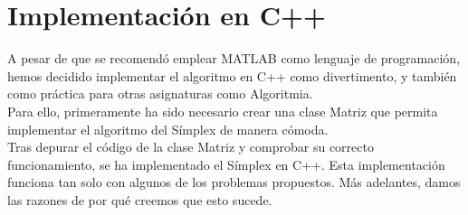 \documentclass[12pt, titlepage]{article}
\begin{document}
\section{Implementación en C++}
A pesar de que se recomendó emplear MATLAB como lenguaje de programación, hemos decidido implementar el algoritmo en C++ como divertimento, y también como práctica para otras asignaturas como Algoritmia.\\
Para ello, primeramente ha sido necesario crear una clase Matriz que permita implementar el algoritmo del Símplex de manera cómoda.\\
Tras depurar el código de la clase Matriz y comprobar su correcto funcionamiento, se ha implementado el Símplex en C++. Esta implementación funciona tan solo con algunos de los problemas propuestos. Más adelantes, damos las razones de por qué creemos que esto sucede.
\end{document}
